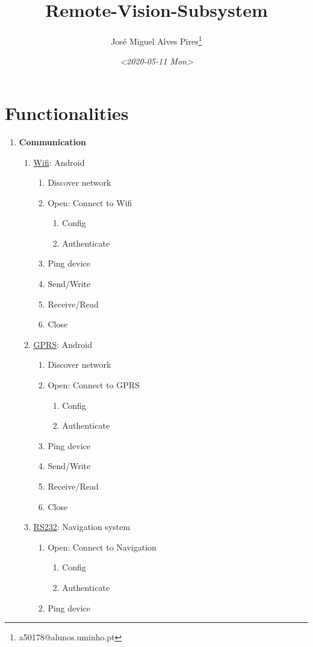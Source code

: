 \documentclass[11pt]{article}
\author{José Miguel Alves Pires\thanks{a50178@alunos.uminho.pt}}
\date{\textit{<2020-05-11 Mon>}}
\title{Remote-Vision-Subsystem}
\begin{document}
\maketitle
\tableofcontents


\section{Functionalities}
\label{sec:org659fa89}
\begin{enumerate}
\item \textbf{Communication}
\begin{enumerate}
\item \uline{Wifi}: Android
\begin{enumerate}
\item Discover network
\item Open: Connect to Wifi
\begin{enumerate}
\item Config
\item Authenticate
\end{enumerate}
\item Ping device
\item Send/Write
\item Receive/Read
\item Close
\end{enumerate}
\item \uline{GPRS}: Android
\begin{enumerate}
\item Discover network
\item Open: Connect to GPRS
\begin{enumerate}
\item Config
\item Authenticate
\end{enumerate}
\item Ping device
\item Send/Write
\item Receive/Read
\item Close
\end{enumerate}
\item \uline{RS232}: Navigation system
\begin{enumerate}
\item Open: Connect to Navigation
\begin{enumerate}
\item Config
\item Authenticate
\end{enumerate}
\item Ping device

\end{enumerate}
\end{enumerate}
\end{enumerate}
\end{document}
